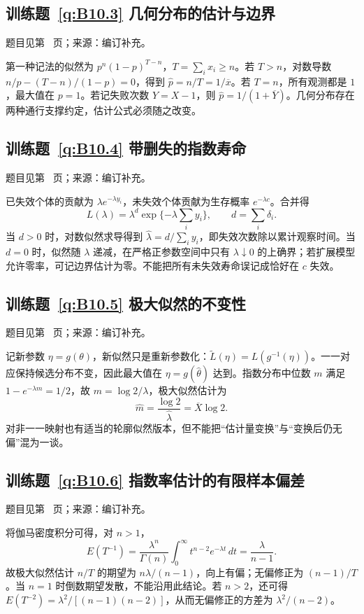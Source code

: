\subsection*{训练题~\ref{q:B10.3} 几何分布的估计与边界}\label{a:B10.3}{\small 题目见第~\pageref{q:B10.3} 页；来源：编订补充。}
\begin{solve}第一种记法的似然为 $p^n(1-p)^{T-n}$，$T=\sum_i x_i\ge n$。若 $T>n$，对数导数 $n/p-(T-n)/(1-p)=0$，得到 $\widehat p=n/T=1/\overline x$。若 $T=n$，所有观测都是 $1$，最大值在 $p=1$。若记失败次数 $Y=X-1$，则 $\widehat p=1/(1+\overline Y)$。几何分布存在两种通行支撑约定，估计公式必须随之改变。\end{solve}

\subsection*{训练题~\ref{q:B10.4} 带删失的指数寿命}\label{a:B10.4}{\small 题目见第~\pageref{q:B10.4} 页；来源：编订补充。}
\begin{solve}已失效个体的贡献为 $\lambda e^{-\lambda y_i}$，未失效个体贡献为生存概率 $e^{-\lambda c}$。合并得\[L(\lambda)=\lambda^d\exp\{-\lambda\sum_i y_i\},\qquad d=\sum_i\delta_i.\]当 $d>0$ 时，对数似然求导得到 $\widehat\lambda=d/\sum_i y_i$，即失效次数除以累计观察时间。当 $d=0$ 时，似然随 $\lambda$ 递减，在严格正参数空间中只有 $\lambda\downarrow0$ 的上确界；若扩展模型允许零率，可记边界估计为零。不能把所有未失效寿命误记成恰好在 $c$ 失效。\end{solve}

\subsection*{训练题~\ref{q:B10.5} 极大似然的不变性}\label{a:B10.5}{\small 题目见第~\pageref{q:B10.5} 页；来源：编订补充。}
\begin{solve}记新参数 $\eta=g(\theta)$，新似然只是重新参数化：$\widetilde L(\eta)=L(g^{-1}(\eta))$。一一对应保持候选分布不变，因此最大值在 $\eta=g(\widehat\theta)$ 达到。指数分布中位数 $m$ 满足 $1-e^{-\lambda m}=1/2$，故 $m=\log2/\lambda$，极大似然估计为\[\widehat m=\frac{\log2}{\widehat\lambda}=\overline X\log2.\]对非一一映射也有适当的轮廓似然版本，但不能把“估计量变换”与“变换后仍无偏”混为一谈。\end{solve}

\subsection*{训练题~\ref{q:B10.6} 指数率估计的有限样本偏差}\label{a:B10.6}{\small 题目见第~\pageref{q:B10.6} 页；来源：编订补充。}
\begin{solve}将伽马密度积分可得，对 $n>1$，\[E(T^{-1})=\frac{\lambda^n}{\Gamma(n)}\int_0^\infty t^{n-2}e^{-\lambda t}\,dt=\frac{\lambda}{n-1}.\]故极大似然估计 $n/T$ 的期望为 $n\lambda/(n-1)$，向上有偏；无偏修正为 $(n-1)/T$。当 $n=1$ 时倒数期望发散，不能沿用此结论。若 $n>2$，还可得 $E(T^{-2})=\lambda^2/[(n-1)(n-2)]$，从而无偏修正的方差为 $\lambda^2/(n-2)$。\end{solve}

